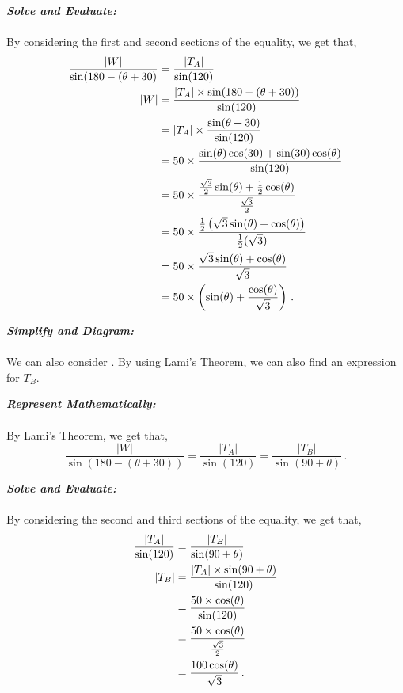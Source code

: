 \begin{subquestions}
\begin{subsubquestions}
		
		\textbf{\textit{Solve and Evaluate:}} \\ \\
		By considering the first and second sections of the equality, we get that,
		\begin{align}
			\frac{|W|}{\sin(180-(\theta+30)} & = \frac{|T_A|}{\sin(120)} \nonumber \\
			|W| & = \frac{|T_A|\times \sin(180-(\theta+30))}{\sin(120)} \nonumber \\
			    & = |T_A| \times \frac{\sin(\theta+30)}{\sin(120)} \nonumber \\
			    & = 50 \times \frac{\sin(\theta)\cos(30)+\sin(30)\cos(\theta)}{\sin(120)} \nonumber \\
			    & = 50 \times \frac{\frac{\sqrt{3}}{2}\sin(\theta)+\frac{1}{2}\cos(\theta)}{\frac{\sqrt{3}}{2}} \nonumber \\
			    & = 50 \times \frac{\frac{1}{2}\left(\sqrt{3}\sin(\theta) + \cos(\theta) \right)}{\frac{1}{2}(\sqrt{3})} \nonumber \\
			    & = 50 \times \frac{\sqrt{3}\sin(\theta)+\cos(\theta)}{\sqrt{3}} \nonumber \\
			    & = 50 \times \left(\sin(\theta)+\frac{\cos(\theta)}{\sqrt{3}} \right) \,.
		\end{align}
		
		
		\subsubquestion
		\textbf{\textit{Simplify and Diagram:}} \\ \\
		We can also consider . By using Lami's Theorem, we can also find an expression for $T_B$.
		
		
		
		
		\textbf{\textit{Represent Mathematically:}} \\ \\
		By Lami's Theorem, we get that,
		\begin{equation}
			\frac{|W|}{\sin(180-(\theta+30))}=\frac{|T_A|}{\sin(120)} = \frac{|T_B|}{\sin(90+\theta)} \,.
		\end{equation}
		
		
		
		
		\textbf{\textit{Solve and Evaluate:}} \\ \\
		By considering the second and third sections of the equality, we get that,
		\begin{align}
		\frac{|T_A|}{\sin(120)} & = \frac{|T_B|}{\sin(90+\theta)} \nonumber \\
		|T_B| & = \frac{|T_A| \times \sin(90+\theta)}{\sin(120)} \nonumber \\
		      & = \frac{50 \times \cos(\theta)}{\sin(120)} \nonumber \\
		      & = \frac{50 \times \cos(\theta)}{\frac{\sqrt{3}}{2}} \nonumber \\
		      & = \frac{100 \cos(\theta)}{\sqrt{3}} \,. 
		\end{align}
	     

\end{subsubquestions}
\end{subquestions}
